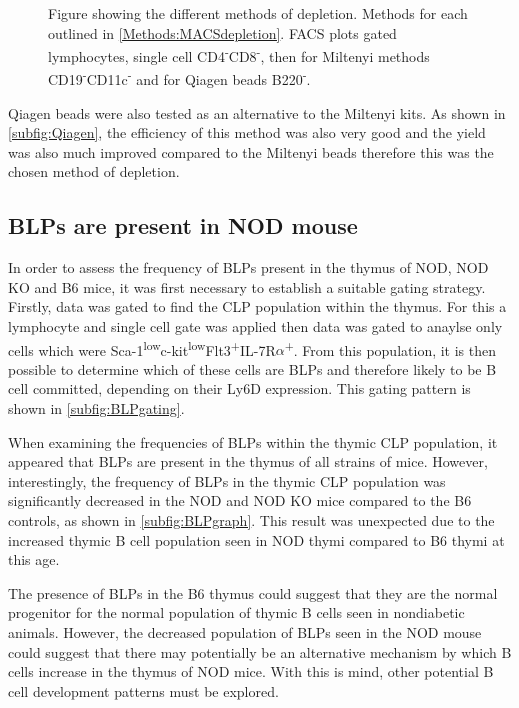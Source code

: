 \begin{figure}
\caption[Optimisation of MACS lineage depletion]{Figure showing the different methods of depletion. 
Methods for each outlined in \cref{Methods:MACSdepletion}.
FACS plots gated lymphocytes, single cell CD4\textsuperscript{-}CD8\textsuperscript{-}, then for Miltenyi methods CD19\textsuperscript{-}CD11c\textsuperscript{-} and for Qiagen beads B220\textsuperscript{-}.}
\end{figure}

Qiagen beads were also tested as an alternative to the Miltenyi kits. 
As shown in \cref{subfig:Qiagen}, the efficiency of this method was also very good and the yield was also much improved compared to the Miltenyi beads therefore this was the chosen method of depletion.


\subsection{BLPs are present in NOD mouse}

In order to assess the frequency of BLPs present in the thymus of NOD, NOD KO and B6 mice, it was first necessary to establish a suitable gating strategy.
Firstly, data was gated to find the CLP population within the thymus.
For this a lymphocyte and single cell gate was applied then data was gated to anaylse only cells which were Sca-1\textsuperscript{low}c-kit\textsuperscript{low}Flt3\textsuperscript{+}IL-7R$\alpha$\textsuperscript{+}.
From this population, it is then possible to determine which of these cells are BLPs and therefore likely to be B cell committed, depending on their Ly6D expression.
This gating pattern is shown in \cref{subfig:BLPgating}.

When examining the frequencies of BLPs within the thymic CLP population, it appeared that BLPs are present in the thymus of all strains of mice.
However, interestingly, the frequency of BLPs in the thymic CLP population was significantly decreased in the NOD and NOD KO mice compared to the B6 controls, as shown in \cref{subfig:BLPgraph}.
This result was unexpected due to the increased thymic B cell population seen in NOD thymi compared to B6 thymi at this age.

The presence of BLPs in the B6 thymus could suggest that they are the normal progenitor for the normal population of thymic B cells seen in nondiabetic animals.
However, the decreased population of BLPs seen in the NOD mouse could suggest that there may potentially be an alternative mechanism by which B cells increase in the thymus of NOD mice.
With this is mind, other potential B cell development patterns must be explored.

